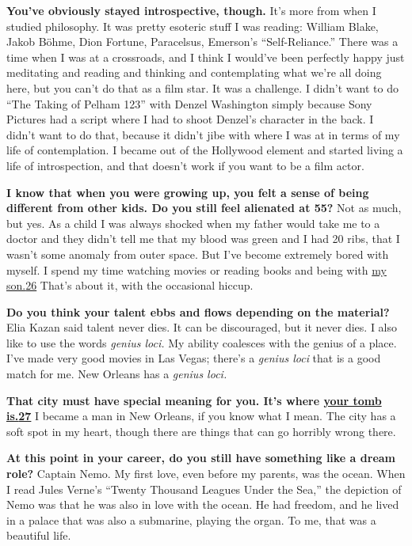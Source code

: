 \textbf{You've obviously stayed introspective, though.} It's more from
when I studied philosophy. It was pretty esoteric stuff I was reading:
William Blake, Jakob Böhme, Dion Fortune, Paracelsus, Emerson's
``Self-Reliance.'' There was a time when I was at a crossroads, and I
think I would've been perfectly happy just meditating and reading and
thinking and contemplating what we're all doing here, but you can't do
that as a film star. It was a challenge. I didn't want to do ``The
Taking of Pelham 123'' with Denzel Washington simply because Sony
Pictures had a script where I had to shoot Denzel's character in the
back. I didn't want to do that, because it didn't jibe with where I was
at in terms of my life of contemplation. I became out of the Hollywood
element and started living a life of introspection, and that doesn't
work if you want to be a film actor.

\textbf{I know that when you were growing up, you felt a sense of being
different from other kids. Do you still feel alienated at 55?} Not as
much, but yes. As a child I was always shocked when my father would take
me to a doctor and they didn't tell me that my blood was green and I had
20 ribs, that I wasn't some anomaly from outer space. But I've become
extremely bored with myself. I spend my time watching movies or reading
books and being with \href{http://nytimes3xbfgragh.onion\#tooltip-26}{my
son.}\href{http://nytimes3xbfgragh.onion\#tooltip-26}{26} That's about
it, with the occasional hiccup.

\textbf{Do you think your talent ebbs and flows depending on the
material?} Elia Kazan said talent never dies. It can be discouraged, but
it never dies. I also like to use the words \emph{genius loci.} My
ability coalesces with the genius of a place. I've made very good movies
in Las Vegas; there's a \emph{genius loci} that is a good match for me.
New Orleans has a \emph{genius loci.}

\textbf{That city must have special meaning for you. It's where
\href{http://nytimes3xbfgragh.onion\#tooltip-27}{your tomb
is.}\href{http://nytimes3xbfgragh.onion\#tooltip-27}{27}} I became a man
in New Orleans, if you know what I mean. The city has a soft spot in my
heart, though there are things that can go horribly wrong there.

\textbf{At this point in your career, do you still have something like a
dream role?} Captain Nemo. My first love, even before my parents, was
the ocean. When I read Jules Verne's ``Twenty Thousand Leagues Under the
Sea,'' the depiction of Nemo was that he was also in love with the
ocean. He had freedom, and he lived in a palace that was also a
submarine, playing the organ. To me, that was a beautiful life.

